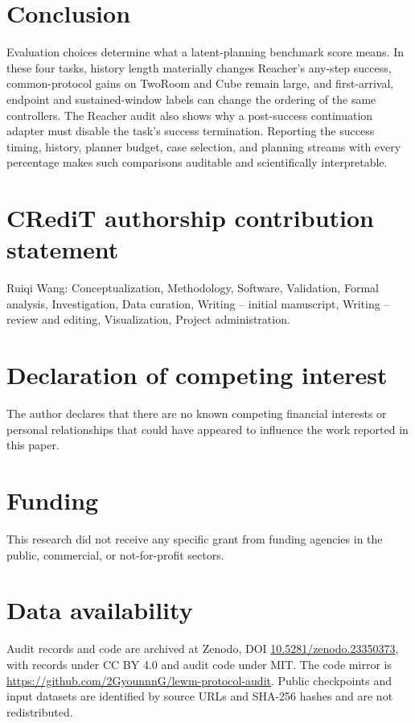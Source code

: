 \documentclass[manuscript,screen,review]{jair}
\begin{document}
\section{Conclusion}
Evaluation choices determine what a latent-planning benchmark score means. In these four tasks, history length materially changes Reacher's any-step success, common-protocol gains on TwoRoom and Cube remain large, and first-arrival, endpoint and sustained-window labels can change the ordering of the same controllers. The Reacher audit also shows why a post-success continuation adapter must disable the task's success termination. Reporting the success timing, history, planner budget, case selection, and planning streams with every percentage makes such comparisons auditable and scientifically interpretable.

\section*{CRediT authorship contribution statement}
Ruiqi Wang: Conceptualization, Methodology, Software, Validation, Formal analysis, Investigation, Data curation, Writing -- initial manuscript, Writing -- review and editing, Visualization, Project administration.

\section*{Declaration of competing interest}
The author declares that there are no known competing financial interests or personal relationships that could have appeared to influence the work reported in this paper.

\section*{Funding}
This research did not receive any specific grant from funding agencies in the public, commercial, or not-for-profit sectors.

\section*{Data availability}
Audit records and code are archived at Zenodo, DOI \href{https://doi.org/10.5281/zenodo.23350373}{10.5281/zenodo.23350373}, with records under CC BY 4.0 and audit code under MIT. The code mirror is \url{https://github.com/2GyounnnG/lewm-protocol-audit}. Public checkpoints and input datasets are identified by source URLs and SHA-256 hashes and are not redistributed.
\end{document}
